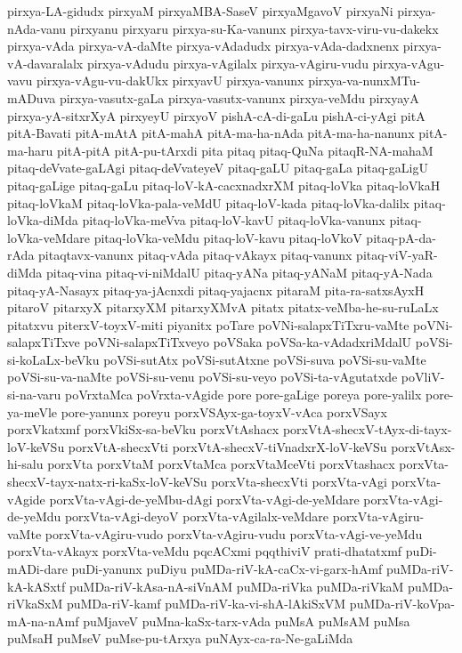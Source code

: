 {pirxya-LA-gidudx
pirxyaM
pirxyaMBA-SaseV
pirxyaMgavoV
pirxyaNi
pirxya-nAda-vanu
pirxyanu
pirxyaru
pirxya-su-Ka-vanunx
pirxya-tavx-viru-vu-dakekx
pirxya-vAda
pirxya-vA-daMte
pirxya-vAdadudx
pirxya-vAda-dadxnenx
pirxya-vA-davaralalx
pirxya-vAdudu
pirxya-vAgilalx
pirxya-vAgiru-vudu
pirxya-vAgu-vavu
pirxya-vAgu-vu-dakUkx
pirxyavU
pirxya-vanunx
pirxya-va-nunxMTu-mADuva
pirxya-vasutx-gaLa
pirxya-vasutx-vanunx
pirxya-veMdu
pirxyayA
pirxya-yA-sitxrXyA
pirxyeyU
pirxyoV
pishA-cA-di-gaLu
pishA-ci-yAgi
pitA
pitA-Bavati
pitA-mAtA
pitA-mahA
pitA-ma-ha-nAda
pitA-ma-ha-nanunx
pitA-ma-haru
pitA-pitA
pitA-pu-tArxdi
pita
pitaq
pitaq-QuNa
pitaqR-NA-mahaM
pitaq-deVvate-gaLAgi
pitaq-deVvateyeV
pitaq-gaLU
pitaq-gaLa
pitaq-gaLigU
pitaq-gaLige
pitaq-gaLu
pitaq-loV-kA-cacxnadxrXM
pitaq-loVka
pitaq-loVkaH
pitaq-loVkaM
pitaq-loVka-pala-veMdU
pitaq-loV-kada
pitaq-loVka-dalilx
pitaq-loVka-diMda
pitaq-loVka-meVva
pitaq-loV-kavU
pitaq-loVka-vanunx
pitaq-loVka-veMdare
pitaq-loVka-veMdu
pitaq-loV-kavu
pitaq-loVkoV
pitaq-pA-da-rAda
pitaqtavx-vanunx
pitaq-vAda
pitaq-vAkayx
pitaq-vanunx
pitaq-viV-yaR-diMda
pitaq-vina
pitaq-vi-niMdalU
pitaq-yANa
pitaq-yANaM
pitaq-yA-Nada
pitaq-yA-Nasayx
pitaq-ya-jAcnxdi
pitaq-yajacnx
pitaraM
pita-ra-satxsAyxH
pitaroV
pitarxyX
pitarxyXM
pitarxyXMvA
pitatx
pitatx-veMba-he-su-ruLaLx
pitatxvu
piterxV-toyxV-miti
piyanitx
poTare
poVNi-salapxTiTxru-vaMte
poVNi-salapxTiTxve
poVNi-salapxTiTxveyo
poVSaka
poVSa-ka-vAdadxriMdalU
poVSi-si-koLaLx-beVku
poVSi-sutAtx
poVSi-sutAtxne
poVSi-suva
poVSi-su-vaMte
poVSi-su-va-naMte
poVSi-su-venu
poVSi-su-veyo
poVSi-ta-vAgutatxde
poVliV-si-na-varu
poVrxtaMca
poVrxta-vAgide
pore
pore-gaLige
poreya
pore-yalilx
pore-ya-meVle
pore-yanunx
poreyu
porxVSAyx-ga-toyxV-vAca
porxVSayx
porxVkatxmf
porxVkiSx-sa-beVku
porxVtAshacx
porxVtA-shecxV-tAyx-di-tayx-loV-keVSu
porxVtA-shecxVti
porxVtA-shecxV-tiVnadxrX-loV-keVSu
porxVtAsx-hi-salu
porxVta
porxVtaM
porxVtaMca
porxVtaMceVti
porxVtashacx
porxVta-shecxV-tayx-natx-ri-kaSx-loV-keVSu
porxVta-shecxVti
porxVta-vAgi
porxVta-vAgide
porxVta-vAgi-de-yeMbu-dAgi
porxVta-vAgi-de-yeMdare
porxVta-vAgi-de-yeMdu
porxVta-vAgi-deyoV
porxVta-vAgilalx-veMdare
porxVta-vAgiru-vaMte
porxVta-vAgiru-vudo
porxVta-vAgiru-vudu
porxVta-vAgi-ve-yeMdu
porxVta-vAkayx
porxVta-veMdu
pqcACxmi
pqqthiviV
prati-dhatatxmf
puDi-mADi-dare
puDi-yanunx
puDiyu
puMDa-riV-kA-caCx-vi-garx-hAmf
puMDa-riV-kA-kASxtf
puMDa-riV-kAsa-nA-siVnAM
puMDa-riVka
puMDa-riVkaM
puMDa-riVkaSxM
puMDa-riV-kamf
puMDa-riV-ka-vi-shA-lAkiSxVM
puMDa-riV-koVpa-mA-na-nAmf
puMjaveV
puMna-kaSx-tarx-vAda
puMsA
puMsAM
puMsa
puMsaH
puMseV
puMse-pu-tArxya
puNAyx-ca-ra-Ne-gaLiMda
}
